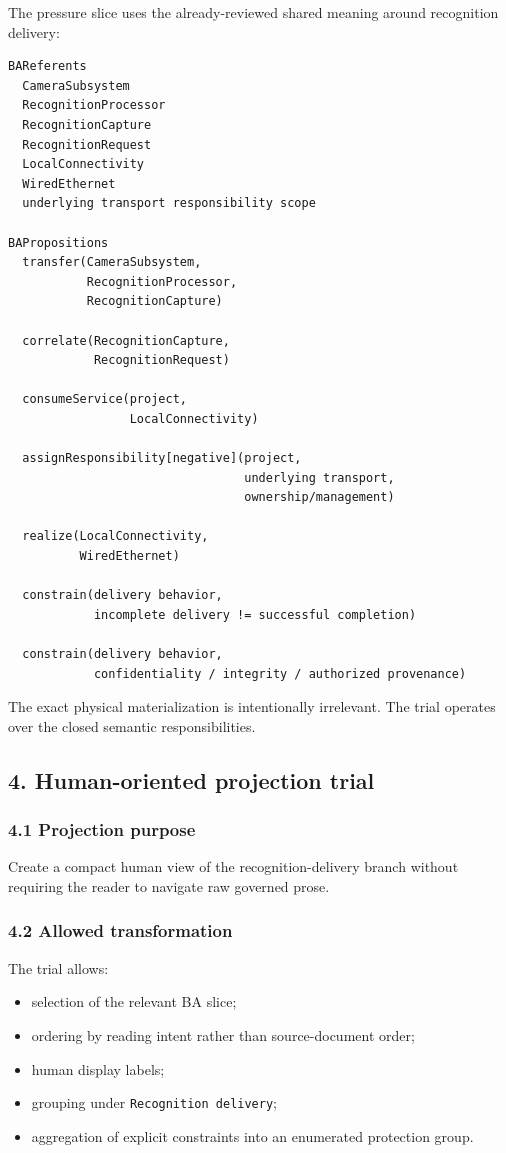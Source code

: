\documentclass[11pt,a4paper]{article}
\providecommand{\tightlist}{\setlength{\itemsep}{0pt}\setlength{\parskip}{0pt}}
\begin{document}
The pressure slice uses the already-reviewed shared meaning around recognition delivery:

\begin{verbatim}
BAReferents
  CameraSubsystem
  RecognitionProcessor
  RecognitionCapture
  RecognitionRequest
  LocalConnectivity
  WiredEthernet
  underlying transport responsibility scope

BAPropositions
  transfer(CameraSubsystem,
           RecognitionProcessor,
           RecognitionCapture)

  correlate(RecognitionCapture,
            RecognitionRequest)

  consumeService(project,
                 LocalConnectivity)

  assignResponsibility[negative](project,
                                 underlying transport,
                                 ownership/management)

  realize(LocalConnectivity,
          WiredEthernet)

  constrain(delivery behavior,
            incomplete delivery != successful completion)

  constrain(delivery behavior,
            confidentiality / integrity / authorized provenance)
\end{verbatim}

The exact physical materialization is intentionally irrelevant. The trial operates over the closed semantic responsibilities.

\subsection{4. Human-oriented projection trial}\label{4-human-oriented-projection-trial}

\subsubsection{4.1 Projection purpose}\label{41-projection-purpose}

Create a compact human view of the recognition-delivery branch without requiring the reader to navigate raw governed prose.

\subsubsection{4.2 Allowed transformation}\label{42-allowed-transformation}

The trial allows:

\begin{itemize}
\tightlist
\item
  selection of the relevant BA slice;
\item
  ordering by reading intent rather than source-document order;
\item
  human display labels;
\item
  grouping under \texttt{Recognition\ delivery};
\item
  aggregation of explicit constraints into an enumerated protection group.
\end{itemize}
\end{document}
